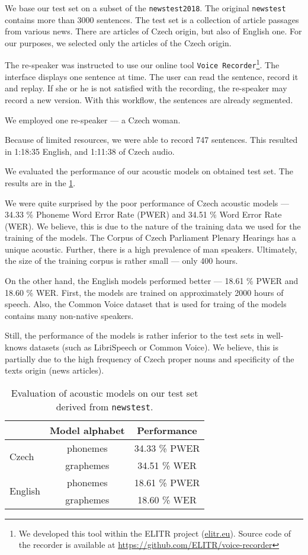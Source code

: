 We base our test set on a subset of the \texttt{newstest2018}. The original \texttt{news\-test} contains more than 3000 sentences. The test set is a collection of article passages from various news. There are articles of Czech origin, but also of English one. For our purposes, we selected only the articles of the Czech origin. 

The re-speaker was instructed to use our online tool \texttt{Voice Recorder}\footnote{We developed this tool within the ELITR project (\url{elitr.eu}).  Source code of the recorder is available at \url{https://github.com/ELITR/voice-recorder}}. The interface displays one sentence at time. The user can read the sentence, record it and replay. If she or he is not satisfied with the recording, the re-speaker may record a new version. With this workflow, the sentences are already segmented.

We employed one re-speaker --- a Czech woman.

Because of limited resources, we were able to record 747 sentences. This resulted in 1:18:35 English, and 1:11:38 of Czech audio.

We evaluated the performance of our acoustic models on obtained test set. The results are in the \cref{tab:acoustic_eval}. 

We were quite surprised by the poor performance of Czech acoustic models --- 34.33 \% Phoneme Word Error Rate (PWER) and 34.51 \% Word Error Rate (WER). We believe, this is due to the nature of the training data we used for the training of the models. The Corpus of Czech Parliament Plenary Hearings has a unique acoustic. Further, there is a high prevalence of man speakers. Ultimately, the size of the training corpus is rather small --- only 400 hours.

On the other hand, the English models performed better --- 18.61 \% PWER and 18.60 \% WER. First, the models are trained on approximately 2000 hours of speech. Also, the Common Voice dataset that is used for traing of the models contains many non-native speakers.

Still, the performance of the models is rather inferior to the test sets in well-knows datasets (such as LibriSpeech or Common Voice). We believe, this is partially due to the high frequency of Czech proper nouns and specificity of the texts origin (news articles). 

\begin{table}[t]
	\centering
	\begin{tabular}{lc|c}
		& Model alphabet & Performance   \\ \hline
		\multirow{2}{*}{Czech}   & phonemes       & 34.33 \% PWER \\
		& graphemes      & 34.51 \% WER  \\ \hline
		\multirow{2}{*}{English} & phonemes       & 18.61 \% PWER \\
		& graphemes      & 18.60 \% WER 
	\end{tabular}
	\caption{Evaluation of acoustic models on our test set derived from \texttt{news\-test}.}
	\label{tab:acoustic_eval}
\end{table}

